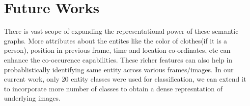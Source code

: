 \documentclass[conference]{IEEEtran}
\begin{document}
{\section{Future Works}
There is vast scope of expanding the representational power of these semantic graphs. More attributes about the entites like the color of clothes(if it is a person), position in previous frame, time and location co-ordinates, etc can enhance the co-occurence capabilities. These richer features can also help in probablistically identifying same entity across various frames/images. In our current work, only 20 entity classes were used for classification, we can extend it to incorporate more number of classes to obtain a dense represntation of underlying images.
%
%



%
%


}
\end{document}
